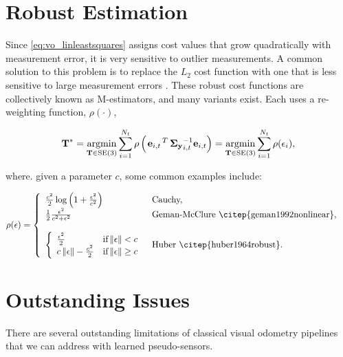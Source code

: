 \section{Robust Estimation}
Since \cref{eq:vo_linleastsquares} assigns cost values that grow quadratically with measurement error, it is very sensitive to outlier measurements.
A common solution to this problem is to replace the $L_2$ cost function with one that is less sensitive to large measurement errors \citep{MacTavish2015-wt}.
These robust cost functions are collectively known as M-estimators, and many variants exist. Each uses a re-weighting function, $\rho(\cdot)$,

\begin{equation}
  \boldsymbol{\mathbf{T}}^* = \operatorname*{argmin}_{\boldsymbol{\mathbf{T}}\in\text{SE}(3)}\sum_{i=1}^{N_t} 
  \rho\left(\left.{\boldsymbol{\mathbf{e}}_{i,t}}\right.^T \boldsymbol{\mathbf{\Sigma_y}}_{i,t}^{-1} \boldsymbol{\mathbf{e}}_{i,t}\right) = \operatorname*{argmin}_{\boldsymbol{\mathbf{T}}\in\text{SE}(3)}\sum_{i=1}^{N_t} 
  \rho(\epsilon_i),
\end{equation}

where. given a parameter $c$, some common examples include:

\begin{align}
\rho(\epsilon) &= \left\{  	\begin{array}{ll}
		 \frac{c^2}{2} \log{\left(1 + \frac{\epsilon^2}{c^2}\right)}   & \mbox{Cauchy,} \\
		 \frac{1}{2} \frac{\epsilon^2}{c^2 + \epsilon^2}  & \mbox{Geman-McClure \citep{geman1992nonlinear},} \\
		 \\
		\left\{  	\begin{array}{ll}  \frac{\epsilon^2}{2} & \mbox{if} \Norm{\epsilon} < c \\
										c\Norm{\epsilon} - \frac{c^2}{2} & \mbox{if} \Norm{\epsilon} \geq c \end{array}
																						 \right.   & \mbox{Huber \citep{huber1964robust}.} \\
	\end{array}
	\right.
\end{align}




\section{Outstanding Issues}
There are several outstanding limitations of classical visual odometry pipelines that we can address with learned pseudo-sensors. 

